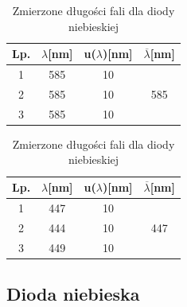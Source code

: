 \documentclass[12pt]{article}
\begin{document}
\begin{table}[!htb]
    \begin{center}
        \begin{minipage}{.49\linewidth}
            \centering
            \caption*{Zmierzone długości fali dla diody żółtej}
            \begin{tabular}{|c|c|c|c|} \hline
                Lp. & $\lambda$[nm] & u($\lambda$)[nm] & $\overline{\lambda}$[nm] \\ \hline
                1 & 585 & 10 & \multirow{3}{*}{585} \\ \cline{1-3} 
                2 & 585 & 10 &  \\ \cline{1-3} 
                3 & 585 & 10 &  \\ \hline
            \end{tabular}
        \end{minipage}
        \begin{minipage}{.49\linewidth}
            \centering
            \caption*{Zmierzone długości fali dla diody niebieskiej}
            \begin{tabular}{|c|c|c|c|} \hline
                Lp. & $\lambda$[nm] & u($\lambda$)[nm] & $\overline{\lambda}$[nm] \\ \hline
                1 & 447 & 10 & \multirow{3}{*}{447} \\ \cline{1-3} 
                2 & 444 & 10 &  \\ \cline{1-3} 
                3 & 449 & 10 &  \\ \hline
            \end{tabular}
        \end{minipage}
    \end{center}
\end{table}

\subsection{Dioda niebieska}
\end{document}
